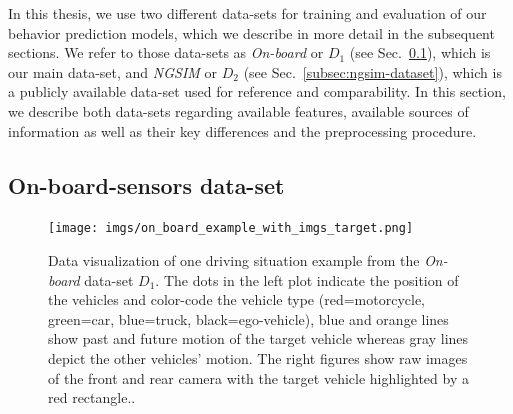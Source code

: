 In this thesis, we use two different data-sets for training and evaluation of our behavior prediction models, which we describe in more detail in the subsequent sections.
We refer to those data-sets as \emph{On-board} or $D_1$ (see Sec.~\ref{subsec:onboard-dataset}), which is our main data-set, and \emph{\acs{NGSIM}} or $D_2$ (see Sec.~\ref{subsec:ngsim-dataset}), which is a publicly available data-set used for reference and comparability.
In this section, we describe both data-sets regarding available features, available sources of information as well as their key differences and the preprocessing procedure.

\subsection{On-board-sensors data-set}
\label{subsec:onboard-dataset}

\begin{figure}[t!]
	\centering
	\texttt{[image: imgs/on\_board\_example\_with\_imgs\_target.png]}
    \caption{Data visualization of one driving situation example from the \emph{On-board} data-set $D_1$. The dots in the left plot indicate the position of the vehicles and color-code the vehicle type (red=motorcycle, green=car, blue=truck, black=ego-vehicle), blue and orange lines show past and future motion of the target vehicle whereas gray lines depict the other vehicles' motion. The right figures show raw images of the front and rear camera with the target vehicle
    highlighted by a red rectangle..}\label{fig:on_board_data_example}
\end{figure}

